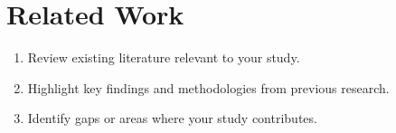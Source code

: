 \section{Related Work}\label{sec:rel_work}

\begin{enumerate}
    \item Review existing literature relevant to your study.
    \item Highlight key findings and methodologies from previous research.
    \item Identify gaps or areas where your study contributes.
\end{enumerate}
